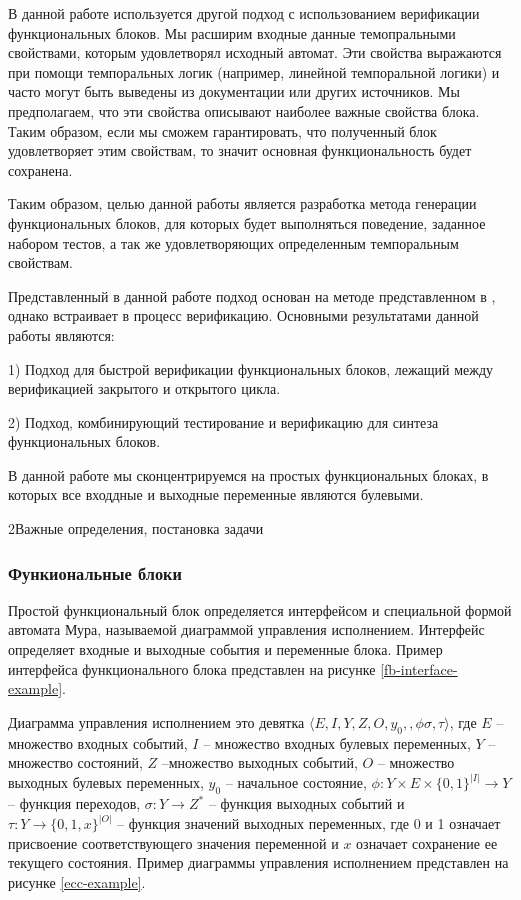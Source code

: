 \documentclass[14pt]{extarticle}
\makeatletter
\theoremstyle{plain}
\theoremstyle{definition}
\renewcommand{\subsection}{\@startsection{subsection}{2}{0mm}%
{2\baselineskip}{\baselineskip}{\bfseries\large\itshape}}
\makeatother
\begin{document}
В данной работе используется другой подход с использованием верификации
функциональных блоков. Мы расширим входные данные темопральными свойствами,
которым удовлетворял исходный автомат. Эти свойства выражаются при помощи
темпоральных логик (например, линейной темпоральной логики) и часто могут быть
выведены из документации или других источников. Мы предполагаем, что эти
свойства описывают наиболее важные свойства блока. Таким образом, если мы
сможем гарантировать, что полученный блок удовлетворяет этим свойствам, то
значит основная функциональность будет сохранена.

Таким образом, целью данной работы является разработка метода генерации
функциональных блоков, для которых будет выполняться поведение, заданное
набором тестов, а так же удовлетворяющих определенным темпоральным свойствам.

Представленный в данной работе подход основан на методе представленном в \cite{rec},
однако встраивает в процесс верификацию. Основными результатами данной работы
являются:

1) Подход для быстрой верификации функциональных блоков, лежащий между
верификацией закрытого и открытого цикла.

2) Подход, комбинирующий тестирование и верификацию для синтеза функциональных
блоков.

В данной работе мы сконцентрируемся на простых функциональных блоках, в которых
все входдные и выходные переменные являются булевыми.

\pagebreak

\subsection{Важные определения, постановка задачи}
\subsubsection{Функиональные блоки}

Простой функциональный блок определяется интерфейсом и специальной формой
автомата Мура, называемой диаграммой управления исполнением. Интерфейс
определяет входные и выходные события и переменные блока. Пример интерфейса
функционального блока представлен на рисунке \ref{fb-interface-example}.

Диаграмма управления исполнением это девятка $\langle E, I, Y, Z, O, y_0,, \phi
\sigma, \tau \rangle$, где $E$ -- множество входных событий, $I$ -- множество
входных булевых переменных, $Y$ -- множество состояний, $Z$ --множество
выходных событий, $O$ -- множество выходных булевых переменных, $y_0$ --
начальное состояние, $\phi : Y \times E \times \{0, 1\}^{|I|} \rightarrow
Y$ -- функция переходов, $\sigma : Y \rightarrow Z^*$ -- функция выходных
событий и $\tau : Y \rightarrow \{0, 1, x\}^{|O|}$ -- функция значений
выходных переменных, где 0 и 1 означает присвоение соответствующего значения
переменной и $x$ означает сохранение ее текущего состояния. Пример диаграммы
управления исполнением представлен на рисунке \ref{ecc-example}.
\end{document}
